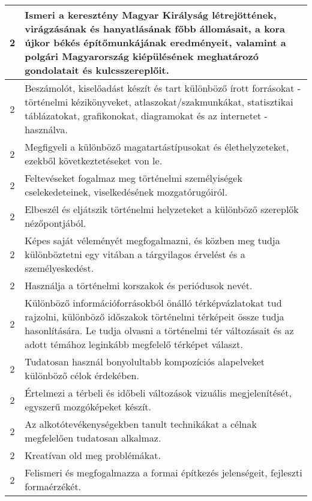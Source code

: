 \begin{longtable}{c | p{12cm} }
                                          2 &  Ismeri a keresztény Magyar Királyság létrejöttének, virágzásának és hanyatlásának főbb állomásait, a kora újkor békés építőmunkájának eredményeit, valamint a polgári Magyarország kiépülésének meghatározó gondolatait és kulcsszereplőit. \\ \hline
                                          2 &  Beszámolót, kiselőadást készít és tart különböző írott forrásokat - történelmi kézikönyveket, atlaszokat/szakmunkákat, statisztikai táblázatokat, grafikonokat, diagramokat és az internetet - használva. \\ \hline
                                          2 &  Megfigyeli a különböző magatartástípusokat és élethelyzeteket, ezekből következtetéseket von le. \\ \hline
                                          2 &  Feltevéseket fogalmaz meg történelmi személyiségek cselekedeteinek, viselkedésének mozgatórugóiról. \\ \hline
                                          2 &  Elbeszél és eljátszik történelmi helyzeteket a különböző szereplők nézőpontjából. \\ \hline
                                          2 &  Képes saját véleményét megfogalmazni, és közben meg tudja különböztetni egy vitában a tárgyilagos érvelést és a személyeskedést. \\ \hline
                                          2 &  Használja a történelmi korszakok és periódusok nevét. \\ \hline
                                          2 &  Különböző információforrásokból önálló térképvázlatokat tud rajzolni, különböző időszakok történelmi térképeit össze tudja hasonlítására. Le tudja olvasni a történelmi tér változásait és az adott témához leginkább megfelelő térképet választ. \\ \hline
                                          2 &  Tudatosan használ bonyolultabb kompozíciós alapelveket különböző célok érdekében. \\ \hline
                                          2 &  Értelmezi a térbeli és időbeli változások vizuális megjelenítését, egyszerű mozgóképeket készít. \\ \hline
                                          2 &  Az alkotótevékenységekben tanult technikákat a célnak megfelelően tudatosan alkalmaz. \\ \hline
                                          2 &  Kreatívan old meg problémákat. \\ \hline
                                          2 &  Felismeri és megfogalmazza a formai építkezés jelenségeit, fejleszti formaérzékét. \\ \hline
                                      

\end{longtable}
